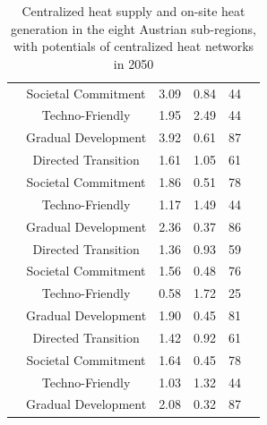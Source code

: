 \begin{table}
{\begin{tabular}{cccccc}
			 & Societal Commitment & 3.09 & 0.84 & 44\\
			 & Techno-Friendly & 1.95 & 2.49 & 44\\
			 & Gradual Development & 3.92 & 0.61 & 87\\\hline
			  			\parbox[t]{15mm}{} & Directed Transition & 1.61 & 1.05 & 61\\
			 & Societal Commitment & 1.86 & 0.51 & 78\\
			 & Techno-Friendly & 1.17 & 1.49 & 44\\
			 & Gradual Development & 2.36 & 0.37 & 86\\\hline
			 \parbox[t]{15mm}{} & Directed Transition & 1.36 & 0.93 & 59\\
			 & Societal Commitment & 1.56 & 0.48 & 76\\
			 & Techno-Friendly & 0.58 & 1.72 & 25\\
			 & Gradual Development & 1.90 & 0.45 & 81\\\hline
			 \parbox[t]{15mm}{} & Directed Transition & 1.42 & 0.92 & 61\\
			 & Societal Commitment & 1.64 & 0.45 & 78\\
			 & Techno-Friendly & 1.03 & 1.32 & 44\\
			 & Gradual Development & 2.08 & 0.32 & 87\\
			\bottomrule
	\end{tabular}}
	\caption{Centralized heat supply and on-site heat generation in the eight Austrian sub-regions, with potentials of centralized heat networks in 2050}
	\label{tab:3}
\end{table}

